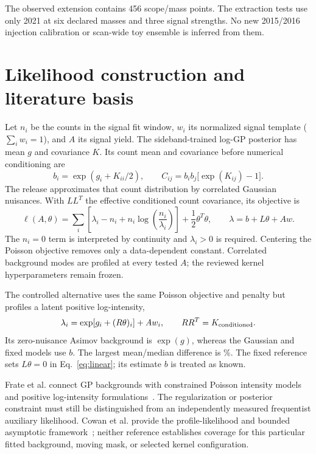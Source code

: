 \documentclass[11pt]{article}
\begin{document}
The observed extension contains 456 scope/mass points. The extraction tests
use only 2021 at six declared masses and three signal strengths. No new
2015/2016 injection calibration or scan-wide toy ensemble is inferred from them.

\clearpage
\section{Likelihood construction and literature basis}

Let $n_i$ be the counts in the signal fit window, $w_i$ its normalized signal
template ($\sum_i w_i=1$), and $A$ its signal yield. The sideband-trained
log-GP posterior has mean $g$ and covariance $K$. Its count mean and covariance
before numerical conditioning are
\begin{equation}
 b_i=\exp(g_i+K_{ii}/2),\qquad
 C_{ij}=b_i b_j\bigl[\exp(K_{ij})-1\bigr].
\end{equation}
The release approximates that count distribution by correlated Gaussian
nuisances. With $LL^T$ the effective conditioned count covariance, its objective is
\begin{equation}
 \ell(A,\theta)=\sum_i\left[\lambda_i-n_i+
 n_i\log\!\left(\frac{n_i}{\lambda_i}\right)\right]
 +\frac12\theta^T\theta,\qquad
 \lambda=b+L\theta+Aw .\label{eq:linear}
\end{equation}
The $n_i=0$ term is interpreted by continuity and $\lambda_i>0$ is required.
Centering the Poisson objective removes only a data-dependent constant.
Correlated background modes are profiled at every tested $A$; the reviewed
kernel hyperparameters remain frozen.

The controlled alternative uses the same Poisson objective and penalty but
profiles a latent positive log-intensity,
\begin{equation}
 \lambda_i=\exp\!\left[g_i+(R\theta)_i\right]+Aw_i,
 \qquad RR^T=K_{\rm conditioned}.\label{eq:log}
\end{equation}
Its zero-nuisance Asimov background is $\exp(g)$, whereas the Gaussian and
fixed models use $b$. The largest mean/median difference is
\MeanMedianMax\%. The fixed reference sets $L\theta=0$ in
Eq.~\eqref{eq:linear}; its estimate $b$ is treated as known.

Frate et al. connect GP backgrounds with constrained Poisson intensity models
and positive log-intensity formulations~\cite{frate}. The regularization or
posterior constraint must still be distinguished from an independently
measured frequentist auxiliary likelihood. Cowan et al. provide the
profile-likelihood and bounded asymptotic framework~\cite{cowan}; neither
reference establishes coverage for this particular fitted background,
moving mask, or selected kernel configuration.
\end{document}
